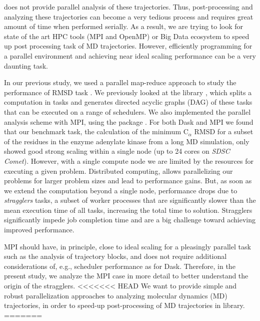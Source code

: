  does not provide parallel analysis of these trajectories.
Thus, post-processing and analyzing these trajectories can become a very tedious process and requires great amount of time when performed serially. 
As a result, we are trying to look for state of the art HPC tools (MPI and OpenMP) or Big Data ecosystem to speed up post processing task of MD trajectories.
However, efficiently programming for a parallel environment and achieving near ideal scaling performance can be a very daunting task. 

In our previous study, we used a parallel map-reduce approach to study the performance of RMSD task \cite{Khoshlessan:2017ab, ICCP-2018}. 
We previously looked at the  library \cite{Rocklin:2015aa}, which splits a computation in tasks and generates directed acyclic graphs (DAG) of these tasks that can be executed on a range of schedulers. 
We also implemented the parallel analysis scheme with MPI, using the  package \cite{Dalcin:2011aa, Dalcin:2005aa}. 
For both Dask and MPI we found that our benchmark task, the calculation of the minimum C$_{\alpha}$ RMSD for a
subset of the residues in the enzyme adenylate kinase from a long MD simulation, only showed good strong scaling within a single node (up to 24 cores on \emph{SDSC Comet}).
However, with a single compute node we are limited by the resources for executing a given problem.
Distributed computing, allows parallelizing our problems for larger problem sizes and lead to performance gains.
But, as soon as we extend the computation beyond a single node, performance drops due to \emph{stragglers} tasks, a subset of worker processes that are significantly slower than the mean execution time of all tasks, increasing the total time to solution.
Stragglers significantly impede job completion time and are a big challenge toward achieving improved performance.

 MPI should have, in principle, close to ideal scaling for a pleasingly parallel task such as the analysis of trajectory blocks, and does not require additional considerations of, e.g., scheduler performance as for Dask. 
Therefore, in the present study, we analyze the MPI case in more detail to better understand the origin of the stragglers.
<<<<<<< HEAD
We want to provide simple and robust parallelization approaches to analyzing molecular dynamics (MD) trajectories, in order to speed-up post-processing of MD trajectories in  library. 
=======

